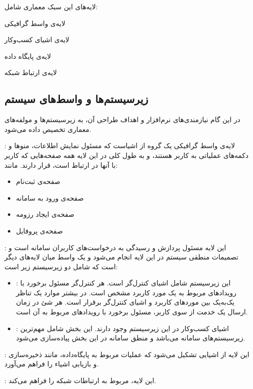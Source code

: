 \documentclass[12pt,svgnames,oneside]{book}
\newcounter{itemadded}
\let\LaTeXStandardEnumerateBegin\enumerate
\let\LaTeXStandardEnumerateEnd\endenumerate
\renewenvironment{enumerate}{%
\LaTeXStandardEnumerateBegin%
\setcounter{itemadded}{0}
}{%
\LaTeXStandardEnumerateEnd%
}%
\begin{document}
لایه‌های این سبک معماری شامل:
\begin{enumerate}
\item 
لایه‌ی واسط گرافیکی
\item
لایه‌ی اشیای کسب‌وکار
\item 
لایه‌ی پایگاه داده
\item 
لایه‌ی ارتباط شبکه
\end{enumerate}

\subsection{زیرسیستم‌‌ها و واسط‌های سیستم}
در این گام نیازمندی‌های نرم‌افزار و اهداف طراحی آن، به زیرسیستم‌ها و مولفه‌های معماری تخصیص داده می‌شود.
\begin{enumerate}
\item {}:
لایه‌ی واسط گرافیکی یک گروه‌ از اشیاست که مسئول نمایش اطلاعات، منو‌ها و دکمه‌های عملیاتی به کاربر هستند، و به طول کلی در این لایه همه صفحه‌هایی که کاربر با آنها در ارتباط است، قرار دارند. مانند:
\begin{itemize}
\item 
صفحه‌ی ثبت‌نام
\item 
صفحه‌ی ورود به سامانه
\item 
صفحه‌ی ایجاد رزومه
\item 
صفحه‌ی پروفایل
\end{itemize}

\item {}:
این لایه مسئول پردازش و رسیدگی به درخواست‌های کاربران سامانه‌ است و تصمیمات منطقی سیستم در این لایه انجام می‌شود و یک واسط میان لایه‌های دیگر است که شامل دو زیرسیستم زیر است:
\begin{itemize}
\item {}:
این زیرسیستم شامل اشیای کنترل‌گر است. هر کنترل‌گر مسئول برخورد با رویداد‌های مربوط به یک مورد کاربرد مشخص است. در بیشتر موارد یک تناظر یک‌به‌یک بین مورد‌های کاربرد و اشیای کنترل‌گر برقرار است. هر شئ در زمان ارسال یک خدمت از سوی کاربر، مسئول برخورد با رویداد‌های مربوط به آن است.

\item {}:
اشیای کسب‌وکار در این زیرسیستم وجود دارند. این بخش شامل مهم‌ترین زیرسیستم‌های سامانه می‌باشد و منطق سامانه در این بخش پیاده‌سازی می‌شود.

\end{itemize}

\item {}:
این لایه‌ از اشیایی تشکیل می‌شود که عملیات مربوط به پایگاه‌داده، مانند ذخیره‌سازی و بازیابی اشیاء را فراهم می‌آورد.

\item {}:
این لایه‌، مربوط به ارتباطات شبکه را فراهم می‌کند.

\end{enumerate}
\end{document}

